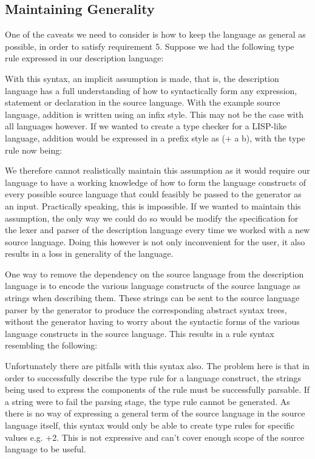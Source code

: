 \documentclass{UoYCSproject}
\begin{document}
\subsection{Maintaining Generality}
One of the caveats we need to consider is how to keep the language as general as
possible, in order to satisfy requirement 5. Suppose we had the following type rule expressed in our description
language:

With this syntax, an implicit assumption is made, that is, the description
language has a full understanding of how to syntactically form any expression, 
statement or declaration in the source language. With the example source language,
addition is written using an infix style. This may not be the case with all 
languages however. If we wanted to create a type checker for a LISP-like language,
addition would be expressed in a prefix style as {\ttfamily (+ a b)}, with the
type rule now being:

We therefore cannot realistically maintain this assumption as it would require
our language to have a working knowledge of how to form the language constructs
of every possible source language that could feasibly be passed to the generator 
as an input. Practically speaking, this is impossible. If we wanted to maintain
this assumption, the only way we could do so would be modify the specification
for the lexer and parser of the description language every time we worked with
a new source language. Doing this however is not only inconvenient for the user,
it also results in a loss in generality of the language.

One way to remove the dependency on the source language from the description
language is to encode the various language constructs of the source language as 
strings when describing them. These strings can be sent to the source language 
parser by the generator to produce the corresponding abstract syntax trees, 
without the generator having to worry about the syntactic forms of the various 
language constructs in the source language. This results in a rule syntax 
resembling the following:

Unfortunately there are pitfalls with this syntax also. The problem here is that 
in order to successfully describe the type rule for a language construct, the
strings being used to express the components of the rule must be 
successfully parsable. If a string were to fail the parsing stage, the type 
rule cannot be generated. As there is no way of expressing a general term of
the source language in the source language itself, this syntax would only
be able to create type rules for specific values e.g.
{+2}. This is not expressive and can't cover enough scope of the 
source language to be useful.
\end{document}
